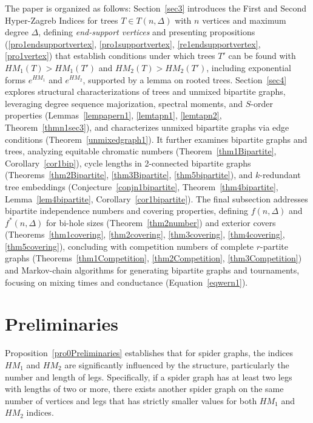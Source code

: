 \documentclass{article}
\theoremstyle{definition}
\begin{document}
The paper is organized as follows: Section~\ref{sec3} introduces the First and Second Hyper-Zagreb Indices for trees $T \in T(n, \Delta)$ with $n$ vertices and maximum degree $\Delta$, defining \emph{end-support vertices} and presenting propositions (\ref{pro1endsupportvertex}, \ref{pro1supportvertex}, \ref{re1endsupportvertex}, \ref{pro1vertex}) that establish conditions under which trees $T'$ can be found with $HM_1(T) > HM_1(T')$ and $HM_2(T) > HM_2(T')$, including exponential forms $e^{HM_1}$ and $e^{HM_2}$, supported by a lemma on rooted trees. Section~\ref{sec4} explores structural characterizations of trees and unmixed bipartite graphs, leveraging degree sequence majorization, spectral moments, and $S$-order properties (Lemmas~\ref{lempapern1}, \ref{lemtapn1}, \ref{lemtapn2}, Theorem~\ref{thmn1sec3}), and characterizes unmixed bipartite graphs via edge conditions (Theorem~\ref{unmixedgraph1}). It further examines bipartite graphs and trees, analyzing equitable chromatic numbers (Theorem~\ref{thm1Bipartite}, Corollary~\ref{cor1bip}), cycle lengths in 2-connected bipartite graphs (Theorems~\ref{thm2Bipartite}, \ref{thm3Bipartite}, \ref{thm5bipartite}), and $k$-redundant tree embeddings (Conjecture~\ref{conjn1bipartite}, Theorem~\ref{thm4bipartite}, Lemma~\ref{lem4bipartite}, Corollary~\ref{cor1bipartite}). The final subsection addresses bipartite independence numbers and covering properties, defining $f(n, \Delta)$ and $f^*(n, \Delta)$ for bi-hole sizes (Theorem~\ref{thm2number}) and exterior covers (Theorems~\ref{thm1covering}, \ref{thm2covering}, \ref{thm3covering}, \ref{thm4covering}, \ref{thm5covering}), concluding with competition numbers of complete $r$-partite graphs (Theorems~\ref{thm1Competition}, \ref{thm2Competition}, \ref{thm3Competition}) and Markov-chain algorithms for generating bipartite graphs and tournaments, focusing on mixing times and conductance (Equation~\ref{eqwern1}).


 \section{Preliminaries}\label{sec2}
Proposition~\ref{pro0Preliminaries} establishes that for spider graphs, the indices $HM_1$ and $HM_2$ are significantly influenced by the structure, particularly the number and length of legs. Specifically, if a spider graph has at least two legs with lengths of two or more, there exists another spider graph on the same number of vertices and legs that has strictly smaller values for both $HM_1$ and $HM_2$ indices.
\end{document}
